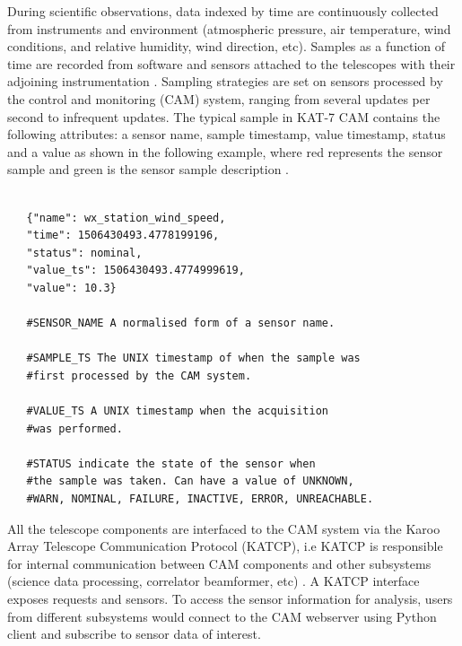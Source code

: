 During scientific observations, data indexed by time are continuously collected from instruments and  environment (atmospheric pressure, air temperature,  wind conditions, and relative humidity, wind direction, etc). Samples as a function of time are recorded from software and sensors attached to the telescopes with their adjoining instrumentation \citep{slabberICALEPCS2017}. Sampling strategies are set on sensors processed by the control and monitoring (CAM) system, ranging from several updates per second to infrequent updates. The typical sample in KAT-7 CAM contains the following attributes: a sensor name, sample timestamp, value timestamp, status and a value as shown in the following example, where red represents the sensor sample and green is the sensor sample description  \citep{slabber2015overview, slabber2015illustrate}. 

 

\begin{tcolorbox} 
\begin{lstlisting}

   {"name": wx_station_wind_speed,
   "time": 1506430493.4778199196,
   "status": nominal,
   "value_ts": 1506430493.4774999619,
   "value": 10.3}

   #SENSOR_NAME A normalised form of a sensor name.

   #SAMPLE_TS The UNIX timestamp of when the sample was
   #first processed by the CAM system.

   #VALUE_TS A UNIX timestamp when the acquisition
   #was performed. 

   #STATUS indicate the state of the sensor when
   #the sample was taken. Can have a value of UNKNOWN,
   #WARN, NOMINAL, FAILURE, INACTIVE, ERROR, UNREACHABLE. 
\end{lstlisting}
\end{tcolorbox}

All the telescope components are interfaced to the CAM system via the Karoo Array Telescope Communication Protocol (KATCP), i.e KATCP is responsible for internal communication between CAM components and other subsystems (science data processing, correlator beamformer, etc) \citep{slabber2015overview}. A KATCP interface exposes requests and sensors. To access the sensor information for analysis, users from different subsystems  would  connect to the CAM webserver using Python client and subscribe to sensor data of interest. 

